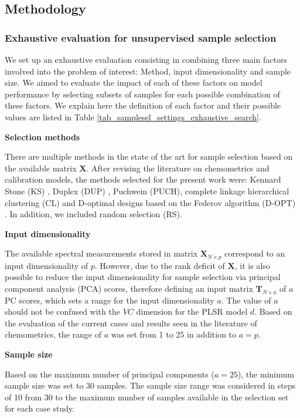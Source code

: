 \documentclass[journal=ancham,manuscript=article]{achemso}
\begin{document}
\subsection*{Methodology}\label{methodology}

\subsubsection*{Exhaustive evaluation for unsupervised sample selection}

We set up an exhaustive evaluation consisting in combining three main factors involved into the problem of interest: Method, input dimensionality and sample size. We aimed to evaluate the impact of each of these factors on model performance by selecting subsets of samples for each possible combination of these factors. We explain here the definition of each factor and their possible values are listed in Table \ref{tab_samplesel_settings_exhaustive_search}.

\textbf{Selection methods}

There are multiple methods in the state of the art for sample selection based on the available matrix $\mathbf{X}$. After revising the literature on chemometrics and calibration models, the methods selected for the present work were: Kennard Stone (KS) \cite{Kennard1969}, Duplex (DUP) \cite{Snee1977}, Puchwein (PUCH)\cite{Puchwein1988}, complete linkage hierarchical clustering (CL) \cite{Naes1990} and D-optimal designs based on the Federov algorithm (D-OPT) \cite{Goos2011}. In addition, we included random selection (RS). 

\textbf{Input dimensionality}

The available spectral measurements stored in matrix $\mathbf{X}_{N\times p}$ correspond to an input dimensionality of $p$. However, due to the rank deficit of $\mathbf{X}$, it is also possible to reduce the input dimensionality for sample selection via principal component analysis (PCA) scores, therefore defining an input matrix $\mathbf{T}_{N\times a}$ of $a$ PC scores, which sets a range for the input dimensionality $a$. The value of $a$ should not be confused with the $VC$ dimension for the PLSR model $d$. Based on the evaluation of the current cases and results seen in the literature of chemometrics, the range of $a$ was set from 1 to 25 in addition to $a=p$. 

\textbf{Sample size}

Based on the maximum number of principal components ($a=25$), the minimum sample size was set to 30 samples. The sample size range was considered in steps of 10 from 30 to the maximum number of samples available in the selection set for each case study. 
\end{document}
